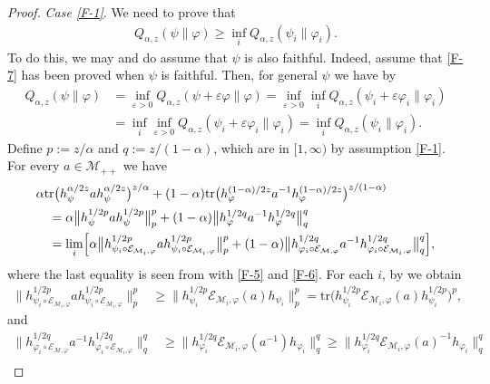 \documentclass[11pt,reqno]{article}
\numberwithin{equation}{section}
\def\cM{\mathcal{M}}
\def\ffi{\varphi}
\def\eps{\varepsilon}
\def\tr{\mathrm{tr}}
\def\cE{\mathcal{E}}
\begin{document}
\begin{proof}
{\it Case \eqref{F-1}}.\enspace
We need to prove that
\begin{align}\label{F-7}
Q_{\alpha,z}(\psi\|\ffi)\ge\inf_iQ_{\alpha,z}(\psi_i\|\ffi_i).
\end{align}
To do this, we may and do assume that $\psi$ is also faithful. Indeed, assume that \eqref{F-7} has been proved
when $\psi$ is faithful. Then, for general $\psi$ we have by \cite[Theorem 1(iii), (iv)]{K}
\begin{align*}
Q_{\alpha,z}(\psi\|\ffi)&=\inf_{\eps>0}Q_{\alpha,z}(\psi+\eps\ffi\|\ffi)
=\inf_{\eps>0}\inf_iQ_{\alpha,z}(\psi_i+\eps\ffi_i\|\ffi_i) \\
&=\inf_i\inf_{\eps>0}Q_{\alpha,z}(\psi_i+\eps\ffi_i\|\ffi_i)=\inf_iQ_{\alpha,z}(\psi_i\|\ffi_i).
\end{align*}
Define $p:=z/\alpha$ and $q:=z/(1-\alpha)$, which are in $[1,\infty)$ by assumption \eqref{F-1}. For every
$a\in\cM_{++}$ we have
\begin{equation}\label{F-8}
\begin{aligned}
&\alpha\tr\bigl(h_\psi^{\alpha/2z}ah_\psi^{\alpha/2z}\bigr)^{z/\alpha}
+(1-\alpha)\tr\bigl(h_\ffi^{(1-\alpha)/2z}a^{-1}h_\ffi^{(1-\alpha)/2z}\bigr)^{z/(1-\alpha)} \\
&\quad=\alpha\big\|h_\psi^{1/2p}ah_\psi^{1/2p}\big\|_p^p
+(1-\alpha)\big\|h_\ffi^{1/2q}a^{-1}h_\ffi^{1/2q}\big\|_q^q \\
&\quad=\lim_i\Bigl[\alpha\big\|h_{\psi_i\circ\cE_{\cM_i,\ffi}}^{1/2p}ah_{\psi_i\circ\cE_{\cM_i,\ffi}}^{1/2p}\big\|_p^p
+(1-\alpha)\big\|h_{\ffi_i\circ\cE_{\cM,\ffi}}^{1/2q}a^{-1}h_{\ffi_i\circ\cE_{\cM_i,\ffi}}^{1/2q}\big\|_q^q\Bigr],
\end{aligned}
\end{equation}
where the last equality is seen from \cite[Lemma 6]{K} with \eqref{F-5} and \eqref{F-6}. For each $i$, by
\cite[(22)]{K} we obtain
\begin{align}\label{F-9}
\big\|h_{\psi_i\circ\cE_{\cM_i,\ffi}}^{1/2p}ah_{\psi_i\circ\cE_{\cM_i,\ffi}}^{1/2p}\big\|_p^p
&\ge\big\|h_{\psi_i}^{1/2p}\cE_{\cM_i,\ffi}(a)h_{\psi_i}\big\|_p^p
=\tr\bigl(h_{\psi_i}^{1/2p}\cE_{\cM_i,\ffi}(a)h_{\psi_i}^{1/2p}\bigr)^p,
\end{align}
and
\begin{equation}\label{F-10}
\begin{aligned}
\big\|h_{\ffi_i\circ\cE_{\cM,\ffi}}^{1/2q}a^{-1}h_{\ffi_i\circ\cE_{\cM_i,\ffi}}^{1/2q}\big\|_q^q
&\ge\big\|h_{\ffi_i}^{1/2q}\cE_{\cM_i,\ffi}(a^{-1})h_{\ffi_i}\big\|_q^q
\ge\big\|h_{\ffi_i}^{1/2q}\cE_{\cM_i,\ffi}(a)^{-1}h_{\ffi_i}\big\|_q^q \\

\end{aligned}
\end{equation}
\end{proof}
\end{document}
